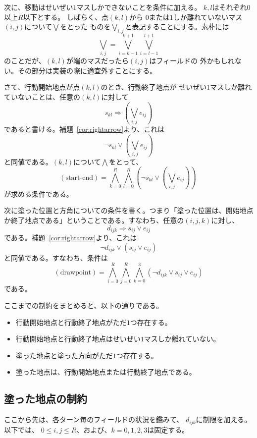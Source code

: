 次に、移動はせいぜい$1$マスしかできないことを条件に加える。
$k, l$はそれぞれ$0$以上$R$以下とする。
しばらく、点$(k, l)$から
$0$または$1$しか離れていないマス$(i, j)$について$\bigvee$をとった
ものを$\bigvee_{i, j}$と表記することにする。素朴には
\[
 \bigvee_{i, j} = \bigvee_{i = k-1}^{k+1} \bigvee_{i = l-1}^{l+1} 
\]
のことだが、$(k, l)$が端のマスだったら$(i, j)$はフィールドの
外かもしれない。その部分は実装の際に適宜外すことにする。

さて、行動開始地点が点$(k, l)$のとき、行動終了地点が
せいぜい$1$マスしか離れていないことは、任意の$(k, l)$に対して
\[
 s_{kl} \Rightarrow \left( \bigvee_{i, j} e_{ij} \right)
\]
であると書ける。補題~\ref{cor:rightarrow}より、これは
\[
 \lnot s_{kl} \lor \left( \bigvee_{i, j} e_{ij} \right)
\]
と同値である。$(k, l)$について$\bigwedge$をとって、
\[
 (\text{start-end}) = \bigwedge_{k = 0}^R \bigwedge_{l = 0}^R 
 \left(\lnot s_{kl} \lor \left( \bigvee_{i, j} e_{ij} \right) \right)\
\]
が求める条件である。

次に塗った位置と方角についての条件を書く。つまり「塗った位置は、開始地点
か終了地点である」ということである。すなわち、任意の$(i, j, k)$に対し、
\[
 d_{ijk} \Longrightarrow s_{ij} \lor e_{ij}
\]
である。補題~\ref{cor:rightarrow}より、これは
\[
 \lnot d_{ijk} \lor (s_{ij} \lor e_{ij})
\]
と同値である。すなわち、条件は
\[
 (\text{drawpoint}) =
 \bigwedge_{i = 0}^{R} \bigwedge_{j = 0}^R \bigwedge_{k = 0}^3
 (\lnot d_{ijk} \lor s_{ij} \lor e_{ij})
\]
である。

\begin{rem}
 ここまでの制約をまとめると、以下の通りである。
 \begin{itemize}
  \item 行動開始地点と行動終了地点がただ$1$つ存在する。
  \item 行動開始地点と行動終了地点はせいぜい$1$マスしか離れていない。
  \item 塗った地点と塗った方向がただ$1$つ存在する。
  \item 塗った地点は、行動開始地点または行動終了地点である。
 \end{itemize}
\end{rem}

\subsection{塗った地点の制約}

ここから先は、各ターン毎のフィールドの状況を鑑みて、
$d_{ijk}$に制限を加える。以下では、
$0 \leq i, j \leq R$、および、$k = 0, 1, 2, 3$は固定する。

